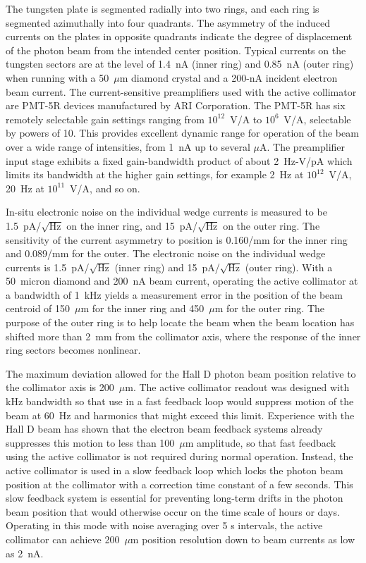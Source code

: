 The tungsten plate is segmented radially into two rings, and each ring is
segmented azimuthally into four quadrants. The asymmetry of the induced 
currents on the plates in opposite quadrants indicate the degree of
displacement of the photon beam from the intended center position. Typical
currents on the tungsten sectors are at the level of 1.4~nA (inner ring)
and 0.85~nA (outer ring) when running with a 50~$\mu$m diamond crystal
and a 200-nA incident electron beam current. The current-sensitive preamplifiers
used with the active collimator are PMT-5R devices manufactured by
ARI Corporation. The PMT-5R has six remotely selectable gain settings
ranging from $10^{12}$~V/A to $10^6$~V/A, selectable by powers of 10.
This provides excellent dynamic
range for operation of the beam over a wide range of intensities, from
1~nA up to several $\mu$A. The preamplifier input stage exhibits a fixed
gain-bandwidth product of about 2~Hz-V/pA which limits its bandwidth at
the higher gain settings, for example 2~Hz at $10^{12}$~V/A, 20~Hz at
$10^{11}$~V/A, and so on.

In-situ electronic noise on the individual wedge currents is measured to
be 1.5~pA/$\sqrt{\mbox{Hz}}$ on the inner ring, and 15~pA/$\sqrt{\mbox{Hz}}$
on the outer ring. The sensitivity of the current asymmetry to position is
0.160/mm for the inner ring and 0.089/mm for the outer. The electronic
noise on the individual wedge currents is 1.5~pA/$\sqrt{\mbox{Hz}}$
(inner ring) and 15~pA/$\sqrt{\mbox{Hz}}$ (outer ring).
With a 50~micron diamond and 200~nA beam current, operating the active
collimator at a bandwidth of 1~kHz yields a measurement error in the
position of the beam centroid of 150~$\mu$m for the inner ring and
450~$\mu$m for the outer ring.
The purpose of the outer ring is to help locate the beam when the beam location
has shifted more than 2~mm from the collimator axis, where the response
of the inner ring sectors becomes nonlinear.

The maximum deviation allowed for the Hall D photon beam position 
relative to the collimator axis is 200~$\mu$m. The active collimator
readout was designed with kHz bandwidth so that use in a
fast feedback loop would suppress motion of the beam at 60~Hz and harmonics
that might exceed this limit. Experience with the Hall D beam has shown
that the electron beam feedback systems already suppresses this motion
to less than 100~$\mu$m amplitude, so that fast feedback using the active
collimator is not required during normal operation. Instead, the active collimator is
used in a slow feedback loop which locks the photon beam position at
the collimator with a correction time constant of a few seconds. This
slow feedback system
is essential for preventing long-term drifts in the photon beam
position that would otherwise occur on the time scale of hours or
days. Operating in this mode with noise averaging over 5 s intervals,
the  active collimator can achieve 200~$\mu$m position resolution down
to beam currents as low as 2~nA. 

